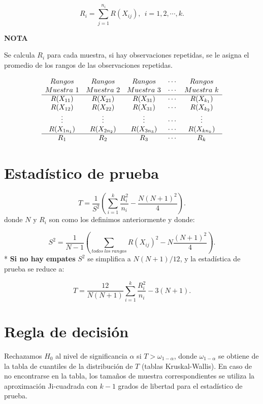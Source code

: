 \documentclass[
  a4paper,
  oneside,
  openany]{book}
\begin{document}
\[R_{i}=\sum_{j=1}^{n_{i}} R(X_{ij}), \ \ i= 1, 2,\cdots,k.\]

\textbf{NOTA}

Se calcula \(R_{i}\) para cada muestra, si hay observaciones repetidas, se le asigna el promedio de los rangos de las observaciones repetidas.

\[
\begin{array}{c c c c c} 
Rangos & Rangos & Rangos & \cdots  & Rangos \\
Muestra\ 1 & Muestra \ 2 & Muestra\ 3 & \cdots & Muestra\ k \\
\hline
R(X_{11}) &  R(X_{21}) & R(X_{31})  & \cdots & R(X_{k_{1}}) \\ 
R(X_{12}) &  R(X_{22}) & R(X_{31}) & \cdots & R(X_{k_{2}}) \\  
\vdots &  \vdots & \vdots  & \cdots &\vdots \\ 
R(X_{1n_{1}}) &R(X_{2n_{2}})   &R(X_{3n_{3}})   & \cdots &  R(X_{kn_{k}}) \\ 
\hline
R_{1} & R_{2} & R_{3} & \cdots&R_{k} \\
\end{array}
\]

\hypertarget{estaduxedstico-de-prueba-6}{%
\section{Estadístico de prueba}\label{estaduxedstico-de-prueba-6}}

\[T= \frac{1}{S^2}\left(\sum_{i=1}^{k}\frac{R^2_{i}}{n_{i}}-\frac{N(N+1)^2}{4}\right).\]
donde \(N\) y \(R_{i}\) son como los definimos anteriormente y donde:

\[ S^2 = \frac{1}{N-1}\left(\sum_{todos\ los\ rangos}R(X_{ij})^2-N\frac{(N+1)^2}{4}\right).\]
* \textbf{Si no hay empates} \(S^2\) se simplifica a \(N(N+1)/12\), y la estadística de prueba se reduce a:

\[ T= \frac{12}{N(N+1)}\sum_{i=1}^{k}\frac{R^2_{i}}{n_{i}}-3(N+1).\]

\hypertarget{regla-de-decisiuxf3n-16}{%
\section{Regla de decisión}\label{regla-de-decisiuxf3n-16}}

Rechazamos \(H_0\) al nivel de significancia \(\alpha\) si \(T>\omega_{1-\alpha}\), donde \(\omega_{1-\alpha}\) se obtiene de la tabla de cuantiles de la distribución de \(T\) (tablas Kruskal-Wallis). En caso de no encontrarse en la tabla, los tamaños de muestra correspondientes se utiliza la aproximación Ji-cuadrada con \(k-1\) grados de libertad para el estadístico de prueba.
\end{document}
